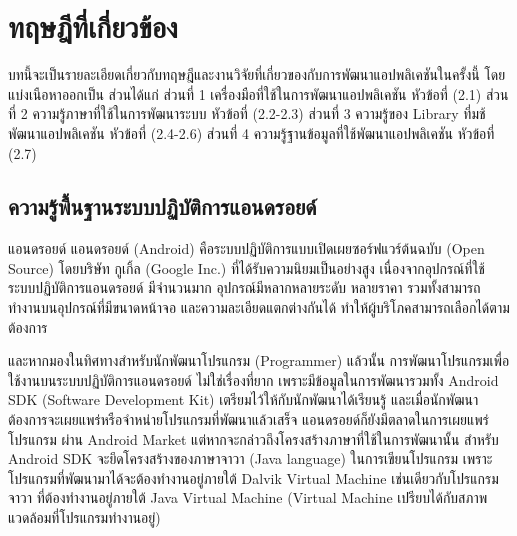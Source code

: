 \chapter{ทฤษฎีที่เกี่ยวข้อง}
บทนี้จะเป็นรายละเอียดเกี่ยวกับทฤษฎีและงานวิจัยที่เกี่ยวของกับการพัฒนาแอปพลิเคชันในครั้งนี้ โดยแบ่งเนือหาออกเป็น ส่วนได้แก่ ส่วนที่ 1 เครื่องมือที่ใช้ในการพัฒนาแอปพลิเคชัน หัวข้อที่ (2.1) ส่วนที่ 2 ความรู้ภาษาที่ใช้ในการพัฒนาระบบ หัวข้อที่ (2.2-2.3) 
ส่วนที่ 3 ความรู้ของ Library ที่มช้พัฒนาแอปพลิเคชัน หัวข้อที่ (2.4-2.6) ส่วนที่ 4 ความรู้ฐานข้อมูลที่ใช้พัฒนาแอปพลิเคชัน หัวข้อที่ (2.7) 

\section{ความรู้พื้นฐานระบบปฏิบัติการแอนดรอยด์}
	แอนดรอยด์ \cite{bib1} แอนดรอยด์ (Android) คือระบบปฏิบัติการแบบเปิดเผยซอร์ฟแวร์ต้นฉบับ (Open Source) โดยบริษัท กูเกิ้ล (Google Inc.) ที่ได้รับความนิยมเป็นอย่างสูง เนื่องจากอุปกรณ์ที่ใช้ระบบปฏิบัติการแอนดรอยด์ มีจำนวนมาก อุปกรณ์มีหลากหลายระดับ หลายราคา รวมทั้งสามารถทำงานบนอุปกรณ์ที่มีขนาดหน้าจอ และความละเอียดแตกต่างกันได้ ทำให้ผู้บริโภคสามารถเลือกได้ตามต้องการ

	และหากมองในทิศทางสำหรับนักพัฒนาโปรแกรม (Programmer) แล้วนั้น การพัฒนาโปรแกรมเพื่อใช้งานบนระบบปฏิบัติการแอนดรอยด์ ไม่ใช่เรื่องที่ยาก เพราะมีข้อมูลในการพัฒนารวมทั้ง Android SDK (Software Development Kit) เตรียมไว้ให้กับนักพัฒนาได้เรียนรู้ และเมื่อนักพัฒนาต้องการจะเผยแพร่หรือจำหน่ายโปรแกรมที่พัฒนาแล้วเสร็จ แอนดรอยด์ก็ยังมีตลาดในการเผยแพร่โปรแกรม ผ่าน Android Market แต่หากจะกล่าวถึงโครงสร้างภาษาที่ใช้ในการพัฒนานั้น สำหรับ Android SDK จะยึดโครงสร้างของภาษาจาวา (Java language) ในการเขียนโปรแกรม เพราะโปรแกรมที่พัฒนามาได้จะต้องทำงานอยู่ภายใต้ Dalvik Virtual Machine เช่นเดียวกับโปรแกรมจาวา ที่ต้องทำงานอยู่ภายใต้ Java Virtual Machine (Virtual Machine เปรียบได้กับสภาพแวดล้อมที่โปรแกรมทำงานอยู่)
	
	
	
